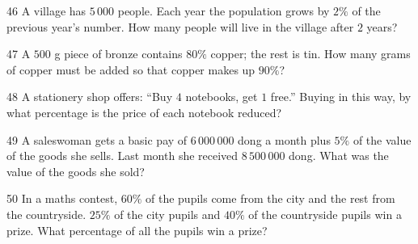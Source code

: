 \gap
\begin{probbox}{46}{}
A village has $5\,000$ people. Each year the population grows by $2\%$ of the previous year's number. How many people will live in the village after $2$ years?
\end{probbox}
\gap
\begin{probbox}{47}{}
A $500$ g piece of bronze contains $80\%$ copper; the rest is tin. How many grams of copper must be added so that copper makes up $90\%$?
\end{probbox}
\gap
\begin{probbox}{48}{}
A stationery shop offers: ``Buy $4$ notebooks, get $1$ free.'' Buying in this way, by what percentage is the price of each notebook reduced?
\end{probbox}
\gap
\begin{probbox}{49}{}
A saleswoman gets a basic pay of $6\,000\,000$ dong a month plus $5\%$ of the value of the goods she sells. Last month she received $8\,500\,000$ dong. What was the value of the goods she sold?
\end{probbox}
\gap
\begin{probbox}{50}{}
In a maths contest, $60\%$ of the pupils come from the city and the rest from the countryside. $25\%$ of the city pupils and $40\%$ of the countryside pupils win a prize. What percentage of all the pupils win a prize?
\end{probbox}

